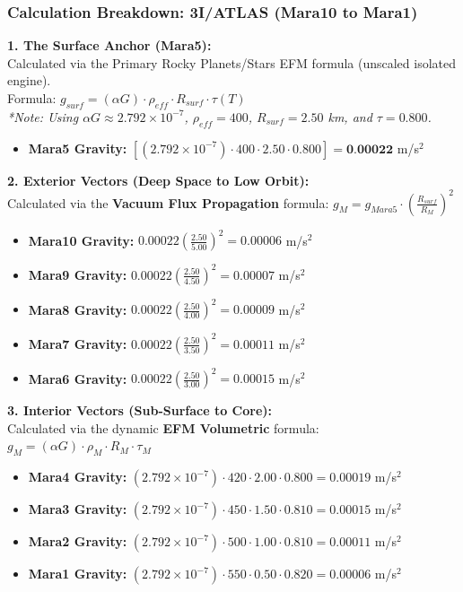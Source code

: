\documentclass[11pt, a4paper]{article}
\begin{document}
\clearpage
\subsubsection{Calculation Breakdown: 3I/ATLAS (Mara10 to Mara1)}

\noindent \textbf{1. The Surface Anchor (Mara5):} \\
Calculated via the Primary Rocky Planets/Stars EFM formula (unscaled isolated engine). \\
Formula: $g_{surf} = (\alpha G) \cdot \rho_{eff} \cdot R_{surf} \cdot \tau(T)$ \\
\textit{*Note: Using $\alpha G \approx 2.792 \times 10^{-7}$, $\rho_{eff} = 400$, $R_{surf} = 2.50$ km, and $\tau = 0.800$.}
\begin{itemize}
  \item \textbf{Mara5 Gravity:} $\left[ (2.792 \times 10^{-7}) \cdot 400 \cdot 2.50 \cdot 0.800 \right] = \textbf{0.00022}$ m/s$^2$
\end{itemize}

\vspace{0.5em}
\noindent \textbf{2. Exterior Vectors (Deep Space to Low Orbit):} \\
Calculated via the \textbf{Vacuum Flux Propagation} formula: $g_M = g_{Mara5} \cdot \left( \frac{R_{surf}}{R_M} \right)^2$
\begin{itemize}
  \item \textbf{Mara10 Gravity:} $0.00022 \left( \frac{2.50}{5.00} \right)^2 = 0.00006$ m/s$^2$
  \item \textbf{Mara9 Gravity:} $0.00022 \left( \frac{2.50}{4.50} \right)^2 = 0.00007$ m/s$^2$
  \item \textbf{Mara8 Gravity:} $0.00022 \left( \frac{2.50}{4.00} \right)^2 = 0.00009$ m/s$^2$
  \item \textbf{Mara7 Gravity:} $0.00022 \left( \frac{2.50}{3.50} \right)^2 = 0.00011$ m/s$^2$
  \item \textbf{Mara6 Gravity:} $0.00022 \left( \frac{2.50}{3.00} \right)^2 = 0.00015$ m/s$^2$
\end{itemize}

\vspace{0.5em}
\noindent \textbf{3. Interior Vectors (Sub-Surface to Core):} \\
Calculated via the dynamic \textbf{EFM Volumetric} formula: $g_M = (\alpha G) \cdot \rho_{M} \cdot R_M \cdot \tau_M$
\begin{itemize}
  \item \textbf{Mara4 Gravity:} $(2.792 \times 10^{-7}) \cdot 420 \cdot 2.00 \cdot 0.800 = 0.00019$ m/s$^2$
  \item \textbf{Mara3 Gravity:} $(2.792 \times 10^{-7}) \cdot 450 \cdot 1.50 \cdot 0.810 = 0.00015$ m/s$^2$
  \item \textbf{Mara2 Gravity:} $(2.792 \times 10^{-7}) \cdot 500 \cdot 1.00 \cdot 0.810 = 0.00011$ m/s$^2$
  \item \textbf{Mara1 Gravity:} $(2.792 \times 10^{-7}) \cdot 550 \cdot 0.50 \cdot 0.820 = 0.00006$ m/s$^2$
\end{itemize}
\end{document}
